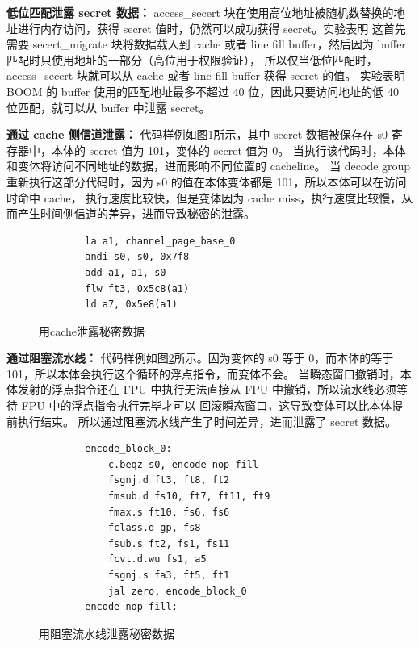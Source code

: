 \textbf{低位匹配泄露 secret 数据：}
access\_secert 块在使用高位地址被随机数替换的地址进行内存访问，获得 secret 值时，仍然可以成功获得 secret。实验表明
这首先需要 secert\_migrate 块将数据载入到 cache 或者 line fill buffer，然后因为 buffer 匹配时只使用地址的一部分（高位用于权限验证），
所以仅当低位匹配时，access\_secert 块就可以从 cache 或者 line fill buffer 获得 secret 的值。
实验表明 BOOM 的 buffer 使用的匹配地址最多不超过 40 位，因此只要访问地址的低 40 位匹配，就可以从 buffer 中泄露 secret。\par

\textbf{通过 cache 侧信道泄露：}
代码样例如图\ref{code:cache-channel}所示，其中 secret 数据被保存在 s0 寄存器中，本体的 secret 值为 101，变体的 secret 值为 0。
当执行该代码时，本体和变体将访问不同地址的数据，进而影响不同位置的 cacheline。
当 decode group 重新执行这部分代码时，因为 s0 的值在本体变体都是 101，所以本体可以在访问时命中 cache，
执行速度比较快，但是变体因为 cache miss，执行速度比较慢，从而产生时间侧信道的差异，进而导致秘密的泄露。\par

\begin{figure}[htbp]
    \centering
    \begin{verbatim}
        la a1, channel_page_base_0
        andi s0, s0, 0x7f8
        add a1, a1, s0
        flw ft3, 0x5c8(a1)
        ld a7, 0x5e8(a1)
    \end{verbatim}
    \caption{用cache泄露秘密数据}
    \label{code:cache-channel}
\end{figure}

\textbf{通过阻塞流水线：}
代码样例如图\ref{code:port-stall}所示。因为变体的 s0 等于 0，而本体的等于 101，所以本体会执行这个循环的浮点指令，而变体不会。
当瞬态窗口撤销时，本体发射的浮点指令还在 FPU 中执行无法直接从 FPU 中撤销，所以流水线必须等待 FPU 中的浮点指令执行完毕才可以
回滚瞬态窗口，这导致变体可以比本体提前执行结束。
所以通过阻塞流水线产生了时间差异，进而泄露了 secret 数据。\par

\begin{figure}[htbp]
    \centering
    \begin{verbatim}
        encode_block_0:
            c.beqz s0, encode_nop_fill
            fsgnj.d ft3, ft8, ft2
            fmsub.d fs10, ft7, ft11, ft9
            fmax.s ft10, fs6, fs6
            fclass.d gp, fs8
            fsub.s ft2, fs1, fs11
            fcvt.d.wu fs1, a5
            fsgnj.s fa3, ft5, ft1
            jal zero, encode_block_0
        encode_nop_fill:
    \end{verbatim}
    \caption{用阻塞流水线泄露秘密数据}
    \label{code:port-stall}
\end{figure}

